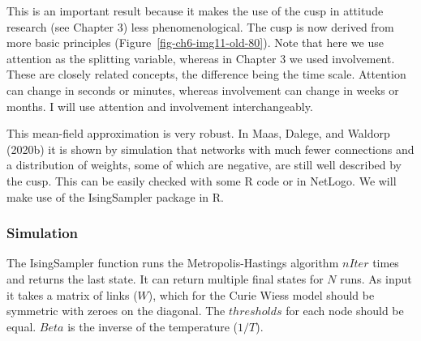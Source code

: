 \documentclass[
  letterpaper,
]{scrbook}
\begin{document}
This is an important result because it makes the use of the cusp in
attitude research (see Chapter 3) less phenomenological. The cusp is now
derived from more basic principles (Figure~\ref{fig-ch6-img11-old-80}).
Note that here we use attention as the splitting variable, whereas in
Chapter 3 we used involvement. These are closely related concepts, the
difference being the time scale. Attention can change in seconds or
minutes, whereas involvement can change in weeks or months. I will use
attention and involvement interchangeably.

This mean-field approximation is very robust. In Maas, Dalege, and
Waldorp (2020b) it is shown by simulation that networks with much fewer
connections and a distribution of weights, some of which are negative,
are still well described by the cusp. This can be easily checked with
some R code or in NetLogo. We will make use of the IsingSampler package
in R.

\hypertarget{simulation}{%
\subsubsection{Simulation}\label{simulation}}

The IsingSampler function runs the Metropolis-Hastings algorithm
\(nIter\) times and returns the last state. It can return multiple final
states for \(N\) runs. As input it takes a matrix of links (\(W\)),
which for the Curie Wiess model should be symmetric with zeroes on the
diagonal. The \(thresholds\) for each node should be equal. \(Beta\) is
the inverse of the temperature (\(1/T\)).
\end{document}
